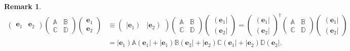 \documentclass[aps, preprint]{revtex4}
\newtheorem{remark}[theorem]{Remark}
\begin{document}
\begin{remark}
\begin{align}\left (\begin{array}{cc}\mathbf{e}_{1} & \mathbf{e}_{2}\end{array}\right ) \left (\begin{array}{cc}\mathbb{A} & \mathbb{B} \\
\mathbb{C} & \mathbb{D}\end{array}\right ) \left (\begin{array}{c}\mathbf{e}_{1} \\
\mathbf{e}_{2}\end{array}\right ) &  \equiv \left (\begin{array}{cc}\left \vert \mathbf{e}_{1}\right ) & \left \vert \mathbf{e}_{2}\right )\end{array}\right ) \left (\begin{array}{cc}\mathbb{A} & \mathbb{B} \\
\mathbb{C} & \mathbb{D}\end{array}\right ) \left (\begin{array}{c}\left (\mathbf{e}_{1}\right \vert  \\
\left (\mathbf{e}_{2}\right \vert \end{array}\right ) =\left (\begin{array}{c}\left (\mathbf{e}_{1}\right \vert  \\
\left (\mathbf{e}_{2}\right \vert \end{array}\right )^{ \dag } \left (\begin{array}{cc}\mathbb{A} & \mathbb{B} \\
\mathbb{C} & \mathbb{D}\end{array}\right ) \left (\begin{array}{c}\left (\mathbf{e}_{1}\right \vert  \\
\left (\mathbf{e}_{2}\right \vert \end{array}\right ) \\
 &  =\left \vert \mathbf{e}_{1}\right )\mathbb{A} \left (\mathbf{e}_{1}\right \vert  +\left \vert \mathbf{e}_{1}\right ) \mathbb{B} \left (\mathbf{e}_{2}\right \vert  +\left \vert \mathbf{e}_{2}\right ) \mathbb{C} \left (\mathbf{e}_{1}\right \vert  +\left \vert \mathbf{e}_{2}\right ) \mathbb{D}\left (\mathbf{e}_{2}\right \vert \text{.}\end{align}
\end{remark}
\end{document}

